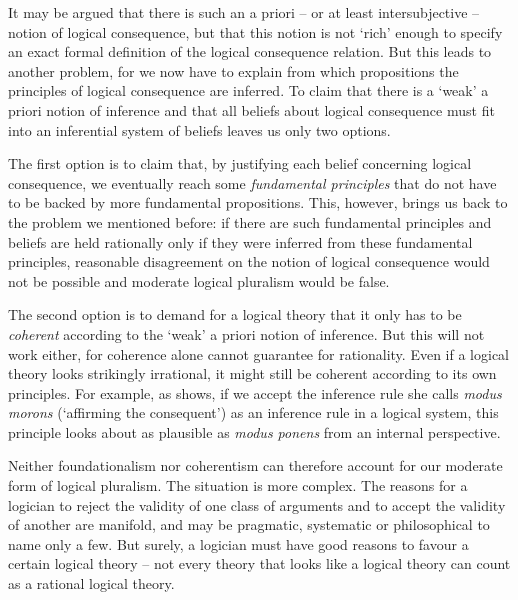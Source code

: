 \documentclass{article}
\begin{document}
It may be argued that there is such an a priori -- or at least intersubjective -- notion of logical consequence, but that this notion is not `rich' enough to specify an exact formal definition of the logical consequence relation. But this leads to another problem, for we now have to explain from which propositions the principles of logical consequence are inferred. To claim that there is a `weak' a priori notion of inference and that all beliefs about logical consequence must fit into an inferential system of beliefs leaves us only two options.

The first option is to claim that, by justifying each belief concerning logical consequence, we eventually reach some \textit{fundamental principles} that do not have to be backed by more fundamental propositions. This, however, brings us back to the problem we mentioned before: if there are such fundamental principles and beliefs are held rationally only if they were inferred from these fundamental principles, reasonable disagreement on the notion of logical consequence would not be possible and moderate logical pluralism would be false. 

The second option is to demand for a logical theory that it only has to be \textit{coherent} according to the `weak' a priori notion of inference. But this will not work either, for coherence alone cannot guarantee for rationality. Even if a logical theory looks strikingly irrational, it might still be coherent according to its own principles. For example, as  shows, if we accept the inference rule she calls \textit{modus morons} (`affirming the consequent') as an inference rule in a logical system, this principle looks about as plausible as \textit{modus ponens} from an internal perspective.

Neither foundationalism nor coherentism can therefore account for our moderate form of logical pluralism. The situation is more complex. The reasons for a logician to reject the validity of one class of arguments and to accept the validity of another are manifold, and may be pragmatic, systematic or philosophical to name only a few. But surely, a logician must have good reasons to favour a certain logical theory -- not every theory that looks like a logical theory can count as a rational logical theory.
\end{document}
